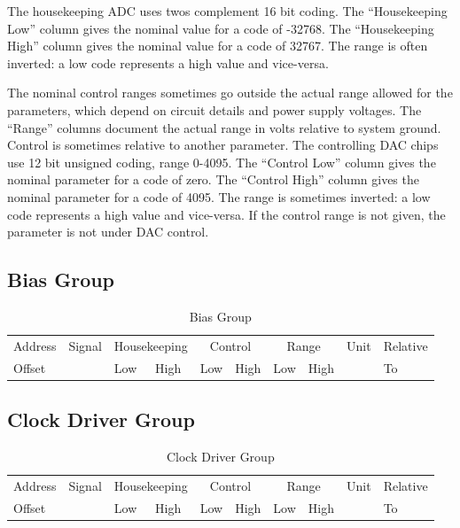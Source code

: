 \documentclass[12pt]{article}
\let\oldsubsection\subsection
\renewcommand{\subsection}{\FloatBarrier\oldsubsection}
\begin{document}
The housekeeping ADC uses twos complement 16 bit coding. The ``Housekeeping Low'' column gives the nominal value for a code of -32768. The ``Housekeeping High'' column gives the nominal value for a code of 32767. The range is often inverted: a low code represents a high value and vice-versa.

The nominal control ranges sometimes go outside the actual range allowed for the parameters, which depend on circuit details and power supply voltages. The ``Range'' columns document the actual range in volts relative to system ground. Control is sometimes relative to another parameter. The controlling DAC chips use 12 bit unsigned coding, range 0-4095. The ``Control Low'' column gives the nominal parameter for a code of zero. The ``Control High'' column gives the nominal parameter for a code of 4095. The range is sometimes inverted: a low code represents a high value and vice-versa. If the control range is not given, the parameter is not under DAC control.
\subsection{Bias Group}
\begin{table}[ht!]
\caption{Bias Group}
\begin{center}
\begin{tabular}{|l|l|l|l|l|l|l|l|l|l|}
\hline
Address & Signal & \multicolumn{2}{c|}{Housekeeping} &  \multicolumn{2}{c|}{Control} &  \multicolumn{2}{c|}{Range} &Unit & Relative \\
Offset &  & Low & High & Low & High & Low & High &  & To  \\
\hline

\hline
\end{tabular}
\end{center}
\vspace{5pt}

\label{biastab}
\end{table}

\subsection{Clock Driver Group}
\begin{table}[ht!]
\caption{Clock Driver Group}
\begin{center}
\begin{tabular}{|l|l|l|l|l|l|l|l|l|l|}
\hline
Address & Signal & \multicolumn{2}{c|}{Housekeeping} &  \multicolumn{2}{c|}{Control} &  \multicolumn{2}{c|}{Range} &Unit & Relative \\
Offset &  & Low & High & Low & High & Low & High &  & To  \\

\hline

\hline
\end{tabular}
\end{center}
\vspace{5pt}

\label{clocktab}
\end{table}
\end{document}
